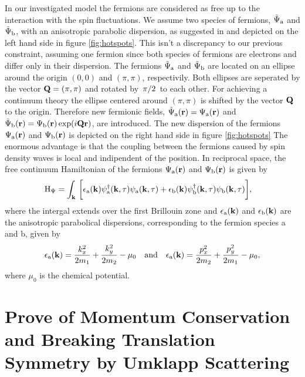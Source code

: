 In our investigated model the fermions are considered as free up to the interaction with the spin fluctuations.
We assume two species of fermions, $\tilde{\Psi}_{\mathrm{a}}$ and $\tilde{\Psi}_{\mathrm{b}}$, with an anisotropic parabolic dispersion, as suggested in \cite{Patel&Sachdev} and depicted on the left hand side in figure \ref{fig:hotspots}.
This isn't a discrepancy to our previous constraint, assuming one fermion since both species of fermions are electrons and differ only in their dispersion.
The fermions $\tilde{\Psi}_{\mathrm{a}}$ and $\tilde{\Psi}_{\mathrm{b}}$ are located on an ellipse around the origin $(0,0)$ and $(\pi,\pi)$, respectivily.
Both ellipses are seperated by the vector $\vb{Q} = (\pi,\pi)$ and rotated by $\flatfrac{\pi}{2}$ to each other.
For achieving a continuum theory the ellipse centered around $(\pi,\pi)$ is shifted by the vector $\vb{Q}$ to the origin.
Therefore new fermionic fields, $\tilde{\Psi}_{\mathrm{a}}(\vb{r}) = \Psi_{\mathrm{a}}(\vb{r})$ and $\tilde{\Psi}_{\mathrm{b}}(\vb{r}) = \Psi_{\mathrm{b}}(\vb{r}) \exp(i\vb{Q}\vb{r})$, are introduced.
The new dispersion of the fermions $\Psi_{\mathrm{a}}(\vb{r})$ and $\Psi_{\mathrm{b}}(\vb{r})$ is depicted on the right hand side in figure \ref{fig:hotspots}
The enormous advantage is that the coupling between the fermions caused by spin density waves is local and indipendent of the position.
In reciprocal space, the free continuum Hamiltonian of the fermions $\Psi_{\mathrm{a}}(\vb{r})$ and $\Psi_{\mathrm{b}}(\vb{r})$ is given by
%
\begin{align}
	\mathrm{H}_{\Psi} &= 
	 	\int_{\vb{k}}\,
	 	\bigg[
	 		\epsilon_{\mathrm{a}}(\vb{k})
	 		\psi_{\mathrm{a}}^{\dag}(\vb{k},\tau)
	 		\psi_{\mathrm{a}}(\vb{k},\tau)
	 		+
	 		\epsilon_{\mathrm{b}}(\vb{k})
	 		\psi_{\mathrm{b}}^{\dag}(\vb{k},\tau)
	 		\psi_{\mathrm{b}}(\vb{k},\tau)
	 	\bigg],
	 \label{eqHamiltonian electrons}
\end{align}
%
where the intergal extends over the first Brillouin zone and $\epsilon_{\mathrm{a}}(\vb{k})$ and $\epsilon_{\mathrm{b}}(\vb{k})$ are the anisotropic parabolical dispersions, corresponding to the fermion species a and b, given by
%
\begin{align}
	\epsilon_{\mt{a}}(\vb{k}) = \frac{k_{x}^{2}}{2m_{1}} + \frac{k_{y}^{2}}{2m_{2}} - \mu_{0}
	\qq{and}
	\epsilon_{\mt{a}}(\vb{k}) = \frac{p_{x}^{2}}{2m_{2}} + \frac{p_{y}^{2}}{2m_{1}} - \mu_{0},
	\label{eq:dispersion relations}
\end{align}
%
where $\mu_{0}$ is the chemical potential.
%
%
\section{Prove of Momentum Conservation and Breaking Translation Symmetry by Umklapp Scattering}
\label{sec:umklapp scattering}
%
%



















